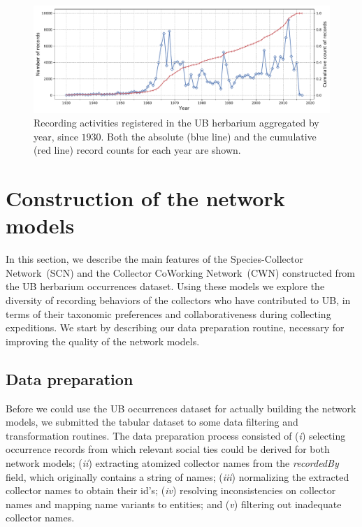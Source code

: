 \begin{figure}[h!]
\centering
\includegraphics[width=\linewidth]{figures/casestudy_ub/ub_records_timeseries.pdf}
\caption[Recording activities registered in the UB herbarium aggregated by year, since $1930$.]{Recording activities registered in the UB herbarium aggregated by year, since $1930$. Both the absolute (blue line) and the cumulative (red line) record counts for each year are shown.}
\label{fig:ub_records_timeseries}
\end{figure}




\section{Construction of the network models}

In this section, we describe the main features of the Species-Collector Network~(SCN) and the Collector CoWorking Network~(CWN) constructed from the UB herbarium occurrences dataset.
Using these models we explore the diversity of recording behaviors of the collectors who have contributed to UB, in terms of their taxonomic preferences and collaborativeness during collecting expeditions.
We start by describing our data preparation routine, necessary for improving the quality of the network models.

\subsection{Data preparation} \label{section:ub_data_preparation}
Before we could use the UB occurrences dataset for actually building the network models, we submitted the tabular dataset to some data filtering and transformation routines.
The data preparation process consisted of 
(\textit{i}) selecting occurrence records from which relevant social ties could be derived for both network models; 
(\textit{ii}) extracting atomized collector names from the \textit{recordedBy} field, which originally contains a string of names;
(\textit{iii}) normalizing the extracted collector names to obtain their id's;
(\textit{iv}) resolving inconsistencies on collector names and mapping name variants to entities; and
(\textit{v}) filtering out inadequate collector names. %

